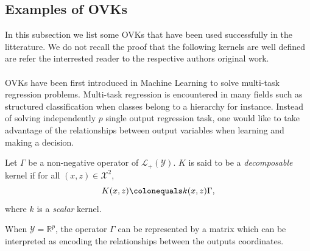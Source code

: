 \subsection{Examples of \aclp{OVK}}
\label{subsec:ovk-ex}
In this subsection we list some \acfp{OVK} that have been used successfully in
the litterature. We do not recall the proof that the following kernels are well
defined are refer the interrested reader to the respective authors original
work.
\paragraph{}
\acsp{OVK} have been first introduced in Machine Learning to solve multi-task
regression problems. Multi-task regression is encountered in many fields such
as structured classification when classes belong to a hierarchy for instance.
Instead of solving independently $p$ single output regression task, one would
like to take advantage of the relationships between output variables when
learning and making a decision.
\begin{proposition}
    \label{dec-kernel}
    Let $\Gamma$ be a non-negative operator of $\mathcal{L}_+(\mathcal{Y})$.
    $K$ is said to be a \emph{decomposable}
    kernel if for
    all $(x,z) \in \mathcal{X}^2$,
    \begin{dmath*}
        K(x,z) \colonequals k(x,z)\Gamma,
    \end{dmath*}
    where $k$ is a \emph{scalar} kernel.
\end{proposition}
When $\mathcal{Y}=\mathbb{R}^p$, the operator $\Gamma$ can be represented by a
matrix which can be interpreted as encoding the relationships between the
outputs coordinates.

